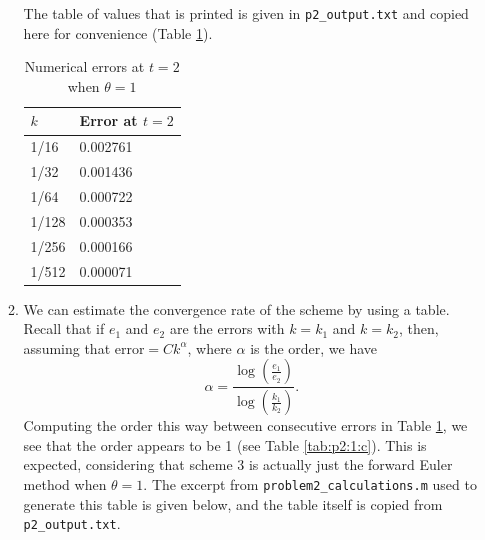 \documentclass{homework}
\begin{document}
\begin{enumerate}
\begin{enumerate}[label={(\alph*)}]
			The table of values that is printed is given in \lstinline{p2_output.txt} and copied here for convenience (Table \ref{tab:p2:1:b}).
			
			\begin{table}[h]
				\centering
				\begin{tabular}{@{}ll@{}}
					\toprule
					$k$ & Error at $t=2$ \\
					\midrule
					1/16 & 0.002761 \\
					1/32 & 0.001436 \\
					1/64 & 0.000722 \\
					1/128 & 0.000353 \\
					1/256 & 0.000166 \\
					1/512 & 0.000071 \\
					\bottomrule
				\end{tabular}
				\caption{Numerical errors at $t=2$ when $\theta = 1$}
				\label{tab:p2:1:b}
			\end{table}
			
			
			
			\item We can estimate the convergence rate of the scheme by using a table. Recall that if $e_1$ and $e_2$ are the errors with $k=k_1$ and $k=k_2$, then, assuming that $\text{error} = Ck^\alpha$, where $\alpha$ is the order, we have
			\begin{equation*}
				\alpha = \frac{\log\left(\frac{e_1}{e_2}\right)}{\log\left(\frac{k_1}{k_2}\right)}.
			\end{equation*}
			Computing the order this way between consecutive errors in Table \ref{tab:p2:1:b}, we see that the order appears to be 1 (see Table \ref{tab:p2:1:c}). This is expected, considering that scheme 3 is actually just the forward Euler method when $\theta =1$. The excerpt from \lstinline{problem2_calculations.m} used to generate this table is given below, and the table itself is copied from \lstinline{p2_output.txt}.
			
			
			

\end{enumerate}
\end{enumerate}
\end{document}
